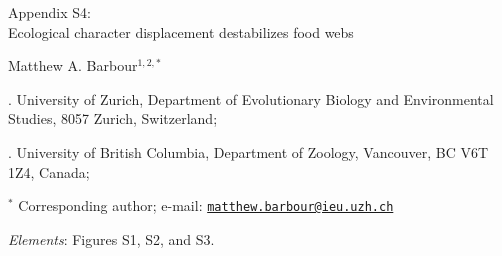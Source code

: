 \documentclass[11pt,]{article}
\title{}
\author{}
\date{}
\begin{document}
\vspace*{0.1cm}

\begin{center} \LARGE Appendix S4: \\ Ecological character displacement destabilizes food webs \end{center}

\bigskip

\begin{center} \large Matthew A. Barbour$^{1,2,\ast}$ \normalsize \end{center}

\bigskip

. University of Zurich, Department of Evolutionary Biology
and Environmental Studies, 8057 Zurich, Switzerland;

. University of British Columbia, Department of Zoology,
Vancouver, BC V6T 1Z4, Canada;

\(^\ast\) Corresponding author; e-mail:
\href{mailto:matthew.barbour@ieu.uzh.ch}{\nolinkurl{matthew.barbour@ieu.uzh.ch}}

\bigskip

\emph{Elements}: Figures S1, S2, and S3.

\newpage
\end{document}

